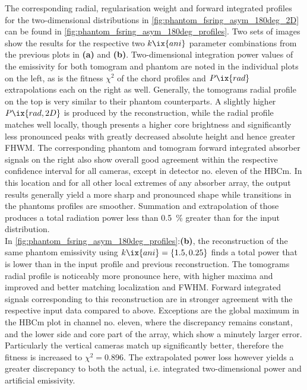                 The corresponding radial, regularisation weight and forward integrated profiles for the two-dimensional distributions in \cref{fig:phantom_fsring_asym_180deg_2D} can be found in \cref{fig:phantom_fsring_asym_180deg_profiles}. Two sets of images show the results for the respective two $k\ix{ani}$ parameter combinations from the previous plots in \textbf{(a)} and \textbf{(b)}. Two-dimensional integration power values of the emissivity for both tomogram and phantom are noted in the individual plots on the left, as is the fitness $\chi^{2}$ of the chord profiles and $P\ix{rad}$ extrapolations each on the right as well. Generally, the tomograms radial profile on the top is very similar to their phantom counterparts. A slightly higher $P\ix{rad,2D}$ is produced by the reconstruction, while the radial profile matches well locally, though presents a higher core brightness and significantly less pronounced peaks with greatly decreased absolute height and hence greater FHWM. The corresponding phantom and tomogram forward integrated absorber signals on the right also show overall good agreement within the respective confidence interval for all cameras, except in detector no. eleven of the HBCm. In this location and for all other local extremes of any absorber array, the output results generally yield a more sharp and pronounced shape while transitions in the phantoms profiles are smoother. Summation and extrapolation of those produces a total radiation power less than \SI{0.5}{\percent} greater than for the input distribution.\\%
                In \cref{fig:phantom_fsring_asym_180deg_profiles}:\textbf{(b)}, the reconstruction of the same phantom emissivity using $k\ix{ani}=\left\{1.5, 0.25\right\}$ finds a total power that is lower than in the input profile and previous reconstruction. The tomograms radial profile is noticeably more pronounce here, with higher maxima and improved and better matching localization and FWHM. Forward integrated signals corresponding to this reconstruction are in stronger agreement with the respective input data compared to above. Exceptions are the global maximum in the HBCm plot in channel no. eleven, where the discrepancy remains constant, and the lower side and core part of the array, which show a minutely larger error. Particularly the vertical cameras match up significantly better, therefore the fitness is increased to $\chi^{2}=$\SI{0.896}{\arbitraryunit}. The extrapolated power loss however yields a greater discrepancy to both the actual, i.e. integrated two-dimensional power and artificial emissivity.\\%
